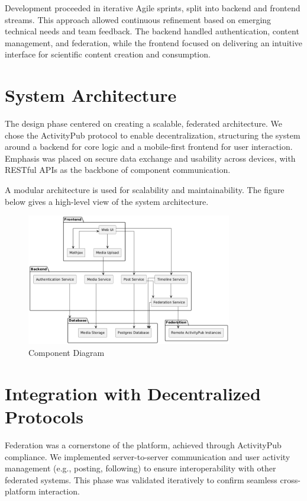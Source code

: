 Development proceeded in iterative Agile sprints, split into backend and frontend streams. This approach allowed continuous refinement based on emerging technical needs and team feedback. The backend handled authentication, content management, and federation, while the frontend focused on delivering an intuitive interface for scientific content creation and consumption.

\section{System Architecture}
 The design phase centered on creating a scalable, federated architecture. We chose the ActivityPub protocol to enable decentralization, structuring the system around a backend for core logic and a mobile-first frontend for user interaction. Emphasis was placed on secure data exchange and usability across devices, with RESTful APIs as the backbone of component communication.

 A modular architecture is used for scalability and maintainability. The figure below gives a high-level view of the system architecture.
\begin{figure}[h!]
    \centering
    \includegraphics[width=0.8\textwidth]{Graphics/componentdiagram.png}
    \caption{Component Diagram}
\end{figure}

\section{Integration with Decentralized Protocols}
\label{sec:integration}

Federation was a cornerstone of the platform, achieved through ActivityPub compliance. We implemented server-to-server communication and user activity management (e.g., posting, following) to ensure interoperability with other federated systems. This phase was validated iteratively to confirm seamless cross-platform interaction.

